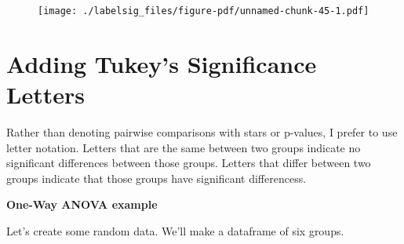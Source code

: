 \documentclass[
  letterpaper,
  DIV=11,
  numbers=noendperiod]{scrreprt}
\begin{document}
\begin{figure}[H]

{\centering \texttt{[image: ./labelsig\_files/figure-pdf/unnamed-chunk-45-1.pdf]}

}

\end{figure}

\hypertarget{adding-tukeys-significance-letters}{%
\section{Adding Tukey's Significance
Letters}\label{adding-tukeys-significance-letters}}

Rather than denoting pairwise comparisons with stars or p-values, I
prefer to use letter notation. Letters that are the same between two
groups indicate no significant differences between those groups. Letters
that differ between two groups indicate that those groups have
significant differencess.

\textbf{One-Way ANOVA example}

Let's create some random data. We'll make a dataframe of six groups.
\end{document}
